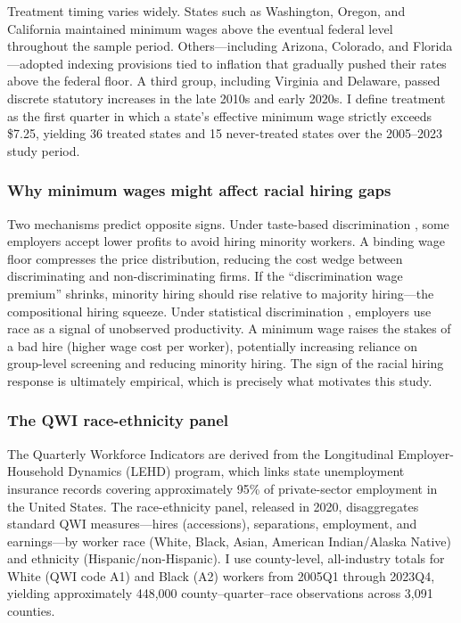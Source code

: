 \documentclass[12pt]{article}
\begin{document}
Treatment timing varies widely. States such as Washington, Oregon, and California maintained minimum wages above the eventual federal level throughout the sample period. Others---including Arizona, Colorado, and Florida---adopted indexing provisions tied to inflation that gradually pushed their rates above the federal floor. A third group, including Virginia and Delaware, passed discrete statutory increases in the late 2010s and early 2020s. I define treatment as the first quarter in which a state's effective minimum wage strictly exceeds \$7.25, yielding 36 treated states and 15 never-treated states over the 2005--2023 study period.

\subsubsection*{Why minimum wages might affect racial hiring gaps} Two mechanisms predict opposite signs. Under taste-based discrimination \citep{becker1957economics}, some employers accept lower profits to avoid hiring minority workers. A binding wage floor compresses the price distribution, reducing the cost wedge between discriminating and non-discriminating firms. If the ``discrimination wage premium'' shrinks, minority hiring should rise relative to majority hiring---the compositional hiring squeeze. Under statistical discrimination \citep{phelps1972statistical, arrow1973theory}, employers use race as a signal of unobserved productivity. A minimum wage raises the stakes of a bad hire (higher wage cost per worker), potentially increasing reliance on group-level screening and reducing minority hiring. The sign of the racial hiring response is ultimately empirical, which is precisely what motivates this study.

\subsubsection*{The QWI race-ethnicity panel} The Quarterly Workforce Indicators are derived from the Longitudinal Employer-Household Dynamics (LEHD) program, which links state unemployment insurance records covering approximately 95\% of private-sector employment in the United States. The race-ethnicity panel, released in 2020, disaggregates standard QWI measures---hires (accessions), separations, employment, and earnings---by worker race (White, Black, Asian, American Indian/Alaska Native) and ethnicity (Hispanic/non-Hispanic). I use county-level, all-industry totals for White (QWI code A1) and Black (A2) workers from 2005Q1 through 2023Q4, yielding approximately 448,000 county--quarter--race observations across 3,091 counties.
\end{document}
